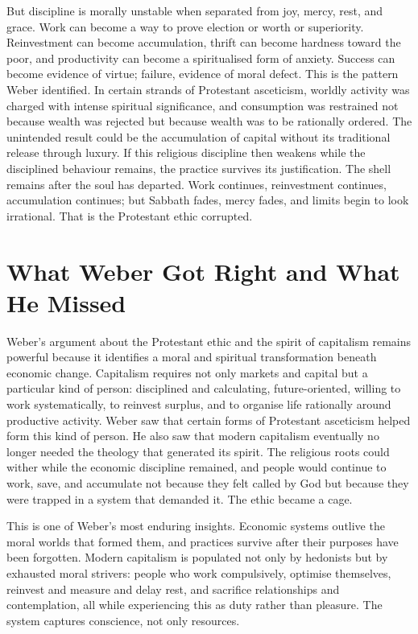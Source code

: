 \documentclass[11pt,a4paper,oneside]{book}
\begin{document}
But discipline is morally unstable when separated from joy, mercy, rest, and grace. Work can become a way to prove election or worth or superiority. Reinvestment can become accumulation, thrift can become hardness toward the poor, and productivity can become a spiritualised form of anxiety. Success can become evidence of virtue; failure, evidence of moral defect. This is the pattern Weber identified. In certain strands of Protestant asceticism, worldly activity was charged with intense spiritual significance, and consumption was restrained not because wealth was rejected but because wealth was to be rationally ordered. The unintended result could be the accumulation of capital without its traditional release through luxury. If this religious discipline then weakens while the disciplined behaviour remains, the practice survives its justification. The shell remains after the soul has departed. Work continues, reinvestment continues, accumulation continues; but Sabbath fades, mercy fades, and limits begin to look irrational. That is the Protestant ethic corrupted.

\section*{What Weber Got Right and What He Missed}

Weber's argument about the Protestant ethic and the spirit of capitalism remains powerful because it identifies a moral and spiritual transformation beneath economic change. Capitalism requires not only markets and capital but a particular kind of person: disciplined and calculating, future-oriented, willing to work systematically, to reinvest surplus, and to organise life rationally around productive activity. Weber saw that certain forms of Protestant asceticism helped form this kind of person. He also saw that modern capitalism eventually no longer needed the theology that generated its spirit. The religious roots could wither while the economic discipline remained, and people would continue to work, save, and accumulate not because they felt called by God but because they were trapped in a system that demanded it. The ethic became a cage.

This is one of Weber's most enduring insights. Economic systems outlive the moral worlds that formed them, and practices survive after their purposes have been forgotten. Modern capitalism is populated not only by hedonists but by exhausted moral strivers: people who work compulsively, optimise themselves, reinvest and measure and delay rest, and sacrifice relationships and contemplation, all while experiencing this as duty rather than pleasure. The system captures conscience, not only resources.
\end{document}
